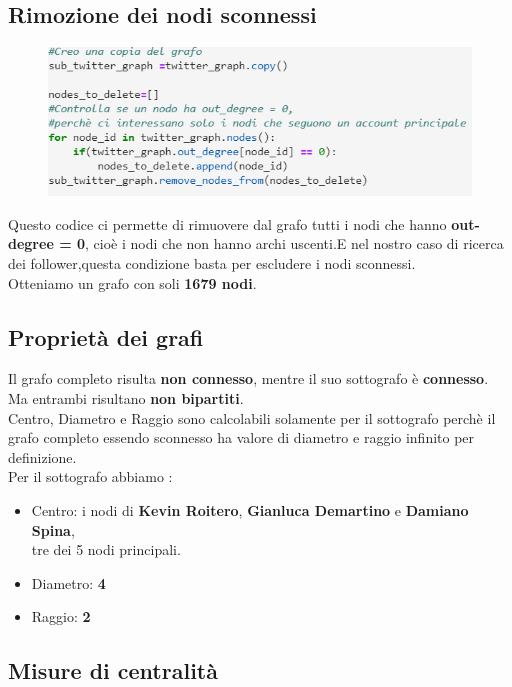 \documentclass[a4paper,11pt]{report}
\begin{document}
\subsection{Rimozione dei nodi sconnessi}
\begin{figure}[h]
	\centering
	\includegraphics[width=0.6\linewidth]{rimozione_nodi_sconnessi}
	\label{fig:rimozionenodisconnessi}
\end{figure}
Questo codice ci permette di rimuovere dal grafo tutti i nodi che hanno \textbf{out-degree = 0}, cioè i nodi che non hanno archi uscenti.E nel nostro caso di ricerca dei follower,questa condizione basta per escludere i nodi sconnessi.\\
Otteniamo un grafo con soli \textbf{1679 nodi}.

\subsection{Proprietà dei grafi}
Il grafo completo risulta \textbf{non connesso}, mentre il suo sottografo è \textbf{connesso}.\\
Ma entrambi risultano \textbf{non bipartiti}.\\
Centro, Diametro e Raggio sono calcolabili solamente per il sottografo perchè il grafo completo essendo sconnesso ha valore di diametro e raggio infinito per definizione.\\
Per il sottografo abbiamo :
		\begin{itemize}
			\item Centro: i nodi di \textbf{Kevin Roitero}, \textbf{Gianluca Demartino} e \textbf{Damiano Spina},\\ tre dei 5 nodi principali.
			\item Diametro:  \textbf{4}
			\item Raggio: \textbf{2}
		\end{itemize}
\subsection{Misure di centralità}
\end{document}
